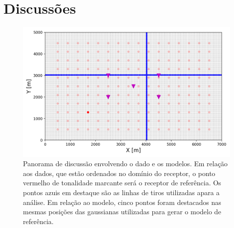 \chapter{Discussões}
\label{ch:discussoes}

 
\begin{figure}[H]
	\centering
	\includegraphics[width=12cm,height=7cm]{Imgs/Discussoes/discuss_geometry.png}
	\caption{Panorama de discussão envolvendo o dado e os modelos. Em relação aos dados, que estão ordenados no domínio do receptor, o ponto vermelho de tonalidade marcante será o receptor de referência. Os pontos azuis em destaque são as linhas de tiros utilizadas apara a análise. Em relação ao modelo, cinco pontos foram destacados nas mesmas posições das gaussianas utilizadas para gerar o modelo de referência.}
	\label{fig:discuss_geometry}	
\end{figure}

